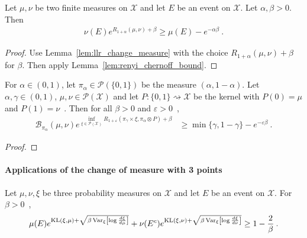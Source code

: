 \begin{lemma}
  \label{lem:renyi_change_measure}
  \leanok
  Let $\mu, \nu$ be two finite measures on $\mathcal X$ and let $E$ be an event on $\mathcal X$. Let $\alpha,\beta > 0$. Then
  \begin{align*}
  \nu(E) e^{R_{1+\alpha}(\mu, \nu) + \beta} \ge \mu(E) - e^{-\alpha \beta} \: .
  \end{align*}
\end{lemma}

\begin{proof}\leanok
{}
Use Lemma~\ref{lem:llr_change_measure} with the choice $R_{1+\alpha}(\mu, \nu) + \beta$ for $\beta$. Then apply Lemma~\ref{lem:renyi_chernoff_bound}.
\end{proof}


\begin{lemma}
  \label{lem:change_measure_risk_cgf}
  For $\alpha \in (0,1)$, let $\pi_\alpha \in \mathcal P(\{0,1\})$ be the measure $(\alpha, 1 - \alpha)$.
  Let $\alpha, \gamma \in (0,1)$, $\mu, \nu \in \mathcal P(\mathcal X)$ and let $P : \{0,1\} \rightsquigarrow \mathcal X$ be the kernel with $P(0) = \mu$ and $P(1) = \nu$~. Then for all $\beta > 0$ and $\varepsilon>0$~,
  \begin{align*}
  \mathcal B_{\pi_\alpha}(\mu, \nu) e^{\inf_{\xi \in \mathcal P(\mathcal X)} R_{1 + \varepsilon}(\pi_\gamma \times \xi, \pi_\alpha \otimes P) + \beta}
  &\ge \min\{\gamma, 1 - \gamma\} - e^{-\varepsilon \beta}
  \: .
  \end{align*}
\end{lemma}

\begin{proof}
\end{proof}



\paragraph{Applications of the change of measure with 3 points}

\begin{lemma}
  \label{lem:change_measure_variance_add}
  \uses{}
  Let $\mu, \nu, \xi$ be three probability measures on $\mathcal X$ and let $E$ be an event on $\mathcal X$. For $\beta > 0$~,
  \begin{align*}
  \mu(E) e^{\operatorname{KL}(\xi, \mu) + \sqrt{\beta \operatorname{Var}_{\xi}\left[\log\frac{d\xi}{d\mu}\right]}} + \nu(E^c) e^{\operatorname{KL}(\xi, \nu) + \sqrt{\beta \operatorname{Var}_{\xi}\left[\log\frac{d\xi}{d\nu}\right]}}
  \ge 1 - \frac{2}{\beta} \: .
  \end{align*}
\end{lemma}

